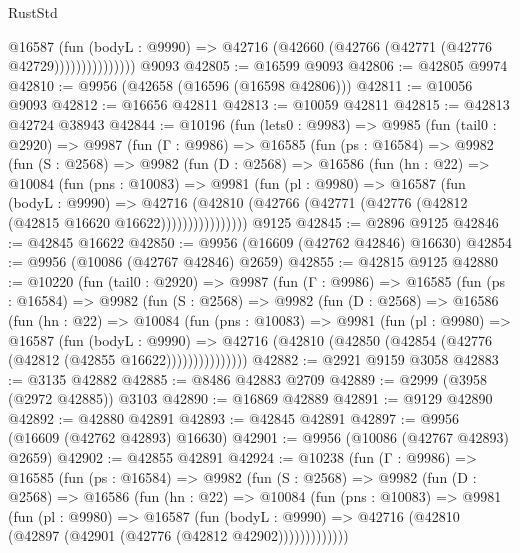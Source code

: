 \begin{lexlean}{RustStd}
\begin{coremodule}
                      @16587
                        (fun (bodyL : @9990) =>
                        @42716 (@42660 (@42766 (@42771 (@42776 @42729)))))))))))))))
    @9093
@42805 := @16599 @9093
@42806 := @42805 @9974
@42810 := @9956 (@42658 (@16596 (@16598 @42806)))
@42811 := @10056 @9093
@42812 := @16656 @42811
@42813 := @10059 @42811
@42815 := @42813 @42724 @38943
@42844 := @10196
    (fun (lets0 : @9983) =>
    @9985
      (fun (tail0 : @2920) =>
      @9987
        (fun (Γ : @9986) =>
        @16585
          (fun (ps : @16584) =>
          @9982
            (fun (S : @2568) =>
            @9982
              (fun (D : @2568) =>
              @16586
                (fun (hn : @22) =>
                @10084
                  (fun (pns : @10083) =>
                  @9981
                    (fun (pl : @9980) =>
                    @16587
                      (fun (bodyL : @9990) =>
                      @42716
                        (@42810
                          (@42766 (@42771 (@42776 (@42812 (@42815 @16620 @16622))))))))))))))))
    @9125
@42845 := @2896 @9125
@42846 := @42845 @16622
@42850 := @9956 (@16609 (@42762 @42846) @16630)
@42854 := @9956 (@10086 (@42767 @42846) @2659)
@42855 := @42815 @9125
@42880 := @10220
    (fun (tail0 : @2920) =>
    @9987
      (fun (Γ : @9986) =>
      @16585
        (fun (ps : @16584) =>
        @9982
          (fun (S : @2568) =>
          @9982
            (fun (D : @2568) =>
            @16586
              (fun (hn : @22) =>
              @10084
                (fun (pns : @10083) =>
                @9981
                  (fun (pl : @9980) =>
                  @16587
                    (fun (bodyL : @9990) =>
                    @42716 (@42810 (@42850 (@42854 (@42776 (@42812 (@42855 @16622)))))))))))))))
@42882 := @2921 @9159 @3058
@42883 := @3135 @42882
@42885 := @8486 @42883 @2709
@42889 := @2999 (@3958 (@2972 @42885)) @3103
@42890 := @16869 @42889
@42891 := @9129 @42890
@42892 := @42880 @42891
@42893 := @42845 @42891
@42897 := @9956 (@16609 (@42762 @42893) @16630)
@42901 := @9956 (@10086 (@42767 @42893) @2659)
@42902 := @42855 @42891
@42924 := @10238
    (fun (Γ : @9986) =>
    @16585
      (fun (ps : @16584) =>
      @9982
        (fun (S : @2568) =>
        @9982
          (fun (D : @2568) =>
          @16586
            (fun (hn : @22) =>
            @10084
              (fun (pns : @10083) =>
              @9981
                (fun (pl : @9980) =>
                @16587
                  (fun (bodyL : @9990) =>
                  @42716 (@42810 (@42897 (@42901 (@42776 (@42812 @42902)))))))))))))

\end{coremodule}
\end{lexlean}

